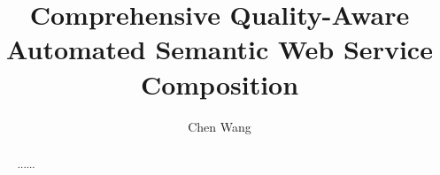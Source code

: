 \documentclass[11pt
              , a4paper
              , twoside
              , openright
              ]{report}
\title{Comprehensive Quality-Aware Automated Semantic Web Service Composition}
\author{Chen Wang}
\begin{document}
\frontmatter



\begin{abstract}

......
\end{abstract}


\maketitle

%

\tableofcontents



\mainmatter




%
%


\backmatter



%


\end{document}
